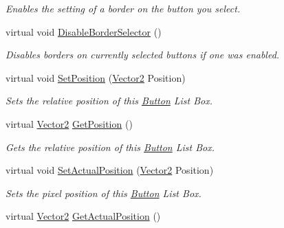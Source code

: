 \begin{DoxyCompactItemize}
\begin{DoxyCompactList}\small\item\em Enables the setting of a border on the button you select. \item\end{DoxyCompactList}\item 
\hypertarget{classphys_1_1UI_1_1ButtonListBox_ae7ea19d82a4c9a7d4262bf41e4204fce}{
virtual void \hyperlink{classphys_1_1UI_1_1ButtonListBox_ae7ea19d82a4c9a7d4262bf41e4204fce}{DisableBorderSelector} ()}
\label{d4/dd7/classphys_1_1UI_1_1ButtonListBox_ae7ea19d82a4c9a7d4262bf41e4204fce}

\begin{DoxyCompactList}\small\item\em Disables borders on currently selected buttons if one was enabled. \item\end{DoxyCompactList}\item 
virtual void \hyperlink{classphys_1_1UI_1_1ButtonListBox_a9a45fe4192092b76bb879b281c29d431}{SetPosition} (\hyperlink{classphys_1_1Vector2}{Vector2} Position)
\begin{DoxyCompactList}\small\item\em Sets the relative position of this \hyperlink{classphys_1_1UI_1_1Button}{Button} List Box. \item\end{DoxyCompactList}\item 
virtual \hyperlink{classphys_1_1Vector2}{Vector2} \hyperlink{classphys_1_1UI_1_1ButtonListBox_ab7834542f8940adba8df6b1eace92e95}{GetPosition} ()
\begin{DoxyCompactList}\small\item\em Gets the relative position of this \hyperlink{classphys_1_1UI_1_1Button}{Button} List Box. \item\end{DoxyCompactList}\item 
virtual void \hyperlink{classphys_1_1UI_1_1ButtonListBox_a84547b5097342c7edf12a407a4208352}{SetActualPosition} (\hyperlink{classphys_1_1Vector2}{Vector2} Position)
\begin{DoxyCompactList}\small\item\em Sets the pixel position of this \hyperlink{classphys_1_1UI_1_1Button}{Button} List Box. \item\end{DoxyCompactList}\item 
virtual \hyperlink{classphys_1_1Vector2}{Vector2} \hyperlink{classphys_1_1UI_1_1ButtonListBox_addc5d7c6ab2a48ffa0d4b2e46c20d9a5}{GetActualPosition} ()

\end{DoxyCompactItemize}
